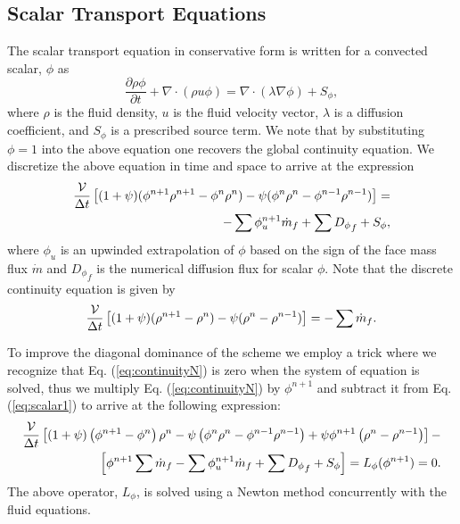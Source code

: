 \subsection{Scalar Transport Equations}

The scalar transport equation in conservative form is written for a
convected scalar, $\phi$ as
\begin{equation}
\frac{\partial \rho \phi}{\partial t} + \nabla \cdot (\rho u \phi) = \nabla\cdot(\lambda \nabla \phi) + S_\phi,
\end{equation}
where $\rho$ is the fluid density, $u$ is the fluid velocity vector,
$\lambda$ is a diffusion coefficient, and $S_\phi$ is a prescribed
source term.  We note that by substituting $\phi=1$ into the above
equation one recovers the global continuity equation.  We discretize
the above equation in time and space to arrive at the expression
\begin{eqnarray}
\label{eq:scalar1}
\frac{\mathcal{V}}{\Delta t} \left[ (1+\psi)(\phi^{n+1}\rho^{n+1}-\phi^n\rho^n) - \psi(\phi^n\rho^n-\phi^{n-1}\rho^{n-1})\right ] = \\\nonumber
 -\sum\phi^{n+1}_u\dot{m}_f + \sum{D_\phi}_f + S_\phi,
\end{eqnarray}
where $\phi_u$ is an upwinded extrapolation of $\phi$ based on the
sign of the face mass flux $\dot{m}$ and ${D_\phi}_f$ is the numerical
diffusion flux for scalar $\phi$.  Note that the discrete continuity equation is given by
\begin{equation}
\frac{\mathcal{V}}{\Delta t} \left[ (1+\psi)(\rho^{n+1}-\rho^n) - \psi(\rho^n-\rho^{n-1})\right ] = - \sum\dot{m}_f.
\label{eq:continuityN}
\end{equation}

To improve the diagonal dominance of the scheme we employ a trick
where we recognize that Eq. (\ref{eq:continuityN}) is zero when
the system of equation is solved, thus we multiply Eq.
(\ref{eq:continuityN}) by $\phi^{n+1}$ and subtract it from Eq.
(\ref{eq:scalar1}) to arrive at the following expression:
\begin{eqnarray}
\frac{\mathcal{V}}{\Delta t} \left[ \left(1+\psi\right)\left(\phi^{n+1}-\phi^n\right)\rho^n - \psi \left(\phi^n\rho^n-\phi^{n-1}\rho^{n-1}\right)+\psi\phi^{n+1}\left(\rho^n-\rho^{n-1}\right)\right ] - \\\nonumber
\left[\phi^{n+1}\sum\dot{m}_f-\sum\phi^{n+1}_u\dot{m}_f + \sum{D_\phi}_f + S_\phi\right] =L_\phi(\phi^{n+1}) = 0.
\label{eq:scalar2}
\end{eqnarray}
The above operator, $L_\phi$, is solved using a Newton method concurrently with the fluid equations.
